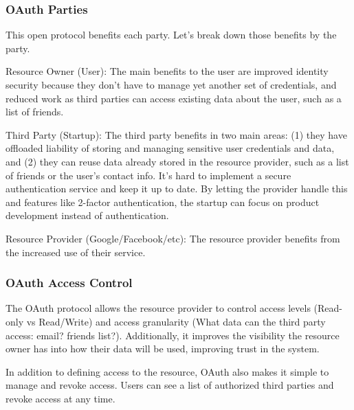 \subsubsection{OAuth Parties}
This open protocol benefits each party. Let's break down those benefits by the party.
\begin{description}
\item{Resource Owner (User):} The main benefits to the user are improved identity security because
they don't have to manage yet another set of credentials, and reduced work as third parties can
access existing data about the user, such as a list of friends.
\item{Third Party (Startup):} The third party benefits in two main areas: (1) they have offloaded
liability of storing and managing sensitive user credentials and data, and (2) they can reuse data
already stored in the resource provider, such as a list of friends or the user's contact info.
It's hard to implement a secure authentication service and keep it up to date. By letting the
provider handle this and features like 2-factor authentication, the startup can focus on product
development instead of authentication.
\item{Resource Provider (Google/Facebook/etc):} The resource provider benefits from the increased
use of their service.
\end{description}

\subsubsection{OAuth Access Control}
The OAuth protocol allows the resource provider to control access levels (Read-only vs Read/Write)
and access granularity (What data can the third party access: email? friends list?). Additionally,
it improves the visibility the resource owner has into how their data will be used, improving trust
in the system.

In addition to defining access to the resource, OAuth also makes it simple to manage and revoke
access. Users can see a list of authorized third parties and revoke access at any time.